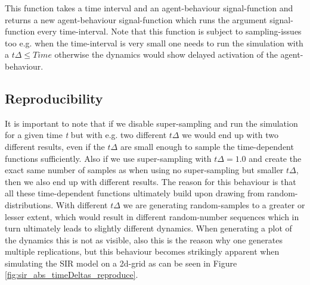 This function takes a time interval and an agent-behaviour signal-function and returns a new agent-behaviour signal-function which runs the argument signal-function every time-interval. Note that this function is subject to sampling-issues too e.g. when the time-interval is very small one needs to run the simulation with a $t\Delta \leq Time$ otherwise the dynamics would show delayed activation of the agent-behaviour.

\subsection{Reproducibility}
It is important to note that if we disable super-sampling and run the simulation for a given time \textit{t} but with e.g. two different $t\Delta$ we would end up with two different results, even if the $t\Delta$ are small enough to sample the time-dependent functions sufficiently. Also if we use super-sampling with $t\Delta = 1.0$ and create the exact same number of samples as when using no super-sampling but smaller $t\Delta$, then we also end up with different results.
The reason for this behaviour is that all these time-dependent functions ultimately build upon drawing from random-distributions. With different $t\Delta$ we are generating random-samples to a greater or lesser extent, which would result in different random-number sequences which in turn ultimately leads to slightly different dynamics. When generating a plot of the dynamics this is not as visible, also this is the reason why one generates multiple replications, but this behaviour becomes strikingly apparent when simulating the SIR model on a 2d-grid as can be seen in Figure \ref{fig:sir_abs_timeDeltas_reproduce}.

